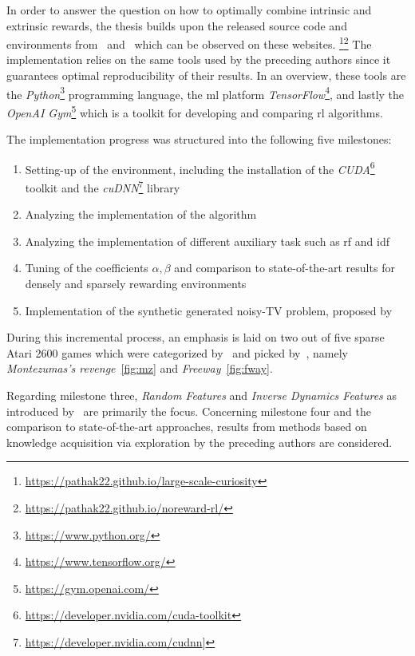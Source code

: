 \documentclass[draft,final]{vutinfth} %
\begin{document}
    In order to answer the question on how to optimally combine intrinsic and extrinsic rewards, the thesis builds upon the released source code and environments from~\cite{burda_large-scale_2018-1} and~\cite{pathak_curiosity-driven_2017-1} which can be observed on these websites. \footnote{\url{https://pathak22.github.io/large-scale-curiosity}}\footnote{\url{https://pathak22.github.io/noreward-rl/}}
    The implementation relies on the same tools used by the preceding authors since it guarantees optimal reproducibility of their results.
    In an overview, these tools are the \textit{Python}\footnote{\url{https://www.python.org/}} programming language, the \gls{ml} platform \textit{TensorFlow}\footnote{\url{https://www.tensorflow.org/}}, and lastly the \textit{OpenAI Gym}\footnote{\url{https://gym.openai.com/}} which is a toolkit for developing and comparing \gls{rl} algorithms.

    The implementation progress was structured into the following five milestones:

    \begin{enumerate}
        \item Setting-up of the environment, including the installation of the \textit{CUDA}\footnote{\url{https://developer.nvidia.com/cuda-toolkit}} toolkit and the \textit{cuDNN}\footnote{\url{https://developer.nvidia.com/cudnn}]} library
        \item Analyzing the implementation of the  algorithm
        \item Analyzing the implementation of different auxiliary task such as \gls{rf} and \gls{idf}
        \item Tuning of the coefficients $\alpha,\beta$ and comparison to state-of-the-art results for densely and sparsely rewarding environments
        \item Implementation of the synthetic generated noisy-TV problem, proposed by~\cite{burda_large-scale_2018-1}
    \end{enumerate}

    During this incremental process, an emphasis is laid on two out of five sparse Atari 2600 games which were categorized by~\cite{bellemare_unifying_2016} and picked by~\citeauthor{burda_large-scale_2018-1}, namely \textit{Montezumas's revenge}~\eqref{fig:mz} and \textit{Freeway}~\eqref{fig:fway}.

    Regarding milestone three, \textit{Random Features} and \textit{Inverse Dynamics Features} as introduced by~\citeauthor{burda_large-scale_2018-1} are primarily the focus.
    Concerning milestone four and the comparison to state-of-the-art approaches, results from methods based on knowledge acquisition via exploration by the preceding authors are considered.
\end{document}
